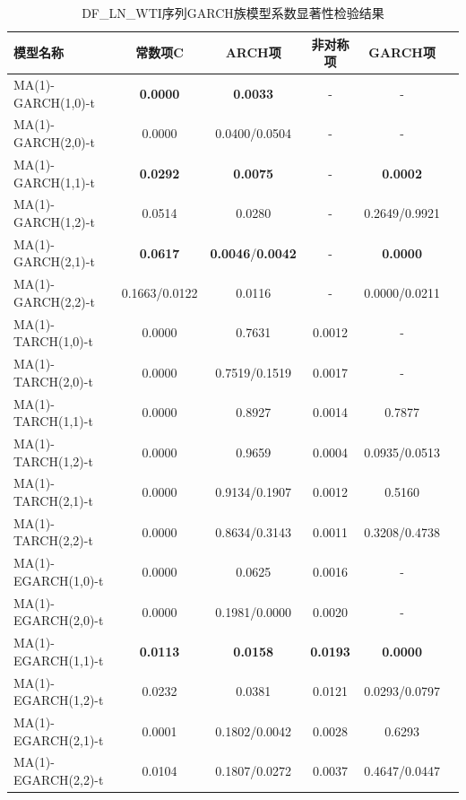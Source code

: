 \documentclass[12pt,a4paper]{ctexart}
\begin{document}
\begin{table}[H]
\centering
\caption{DF\_LN\_WTI序列GARCH族模型系数显著性检验结果}
\label{tab:garch_pvalue_wti}
\setlength{\tabcolsep}{8pt}
\begin{tabular}{lccccc}
\toprule[1.2pt]
模型名称           & 常数项C & ARCH项 & 非对称项 & GARCH项 \\
\midrule[0.75pt]
MA(1)-GARCH(1,0)-t     & \textbf{0.0000} & \textbf{0.0033} & - & - \\
MA(1)-GARCH(2,0)-t     & 0.0000 & 0.0400/0.0504 & - & - \\
MA(1)-GARCH(1,1)-t     & \textbf{0.0292} & \textbf{0.0075} & - & \textbf{0.0002} \\
MA(1)-GARCH(1,2)-t     & 0.0514 & 0.0280 & - & 0.2649/0.9921 \\
MA(1)-GARCH(2,1)-t     & \textbf{0.0617} & \textbf{0.0046}/\textbf{0.0042} & - & \textbf{0.0000} \\
MA(1)-GARCH(2,2)-t     & 0.1663/0.0122 & 0.0116 & - & 0.0000/0.0211 \\
\midrule
MA(1)-TARCH(1,0)-t     & 0.0000 & 0.7631 & 0.0012 & - \\
MA(1)-TARCH(2,0)-t     & 0.0000 & 0.7519/0.1519 & 0.0017 & - \\
MA(1)-TARCH(1,1)-t     & 0.0000 & 0.8927 & 0.0014 & 0.7877 \\
MA(1)-TARCH(1,2)-t     & 0.0000 & 0.9659 & 0.0004 & 0.0935/0.0513 \\
MA(1)-TARCH(2,1)-t     & 0.0000 & 0.9134/0.1907 & 0.0012 & 0.5160 \\
MA(1)-TARCH(2,2)-t     & 0.0000 & 0.8634/0.3143 & 0.0011 & 0.3208/0.4738 \\
\midrule
MA(1)-EGARCH(1,0)-t    & 0.0000 & 0.0625 & 0.0016 & - \\
MA(1)-EGARCH(2,0)-t    & 0.0000 & 0.1981/0.0000 & 0.0020 & - \\
MA(1)-EGARCH(1,1)-t    & \textbf{0.0113} & \textbf{0.0158} & \textbf{0.0193} & \textbf{0.0000} \\
MA(1)-EGARCH(1,2)-t    & 0.0232 & 0.0381 & 0.0121 & 0.0293/0.0797 \\
MA(1)-EGARCH(2,1)-t    & 0.0001 & 0.1802/0.0042 & 0.0028 & 0.6293 \\
MA(1)-EGARCH(2,2)-t    & 0.0104 & 0.1807/0.0272 & 0.0037 & 0.4647/0.0447 \\
\bottomrule[1.2pt]
\end{tabular}
\end{table}
\end{document}
